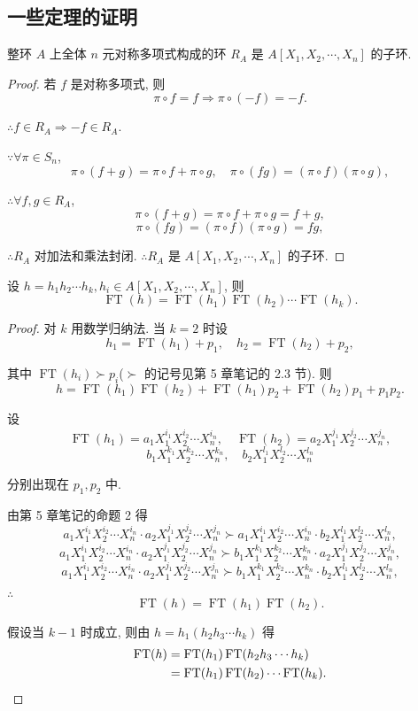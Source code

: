 \documentclass[UTF8]{ctexart}
\begin{document}
\subsection{一些定理的证明}
\begin{theorem}
    整环 $A$ 上全体 $n$ 元对称多项式构成的环 $R_A$ 是 $A[X_1,X_2,\cdots,X_n]$ 的子环.
\end{theorem}
\begin{proof}
    若 $f$ 是对称多项式, 则
    \[\pi\circ f=f\Rightarrow\pi\circ(-f)=-f.\]

    $\therefore f\in R_A\Rightarrow-f\in R_A$.

    $\because\forall\pi\in S_n$,
    \[\pi\circ(f+g)=\pi\circ f+\pi\circ g,\quad\pi\circ(fg)=(\pi\circ f)(\pi\circ g),\]

    $\therefore\forall f,g\in R_A$,
    \[\pi\circ(f+g)=\pi\circ f+\pi\circ g=f+g,\]
    \[\pi\circ(fg)=(\pi\circ f)(\pi\circ g)=fg,\]

    $\therefore R_A$ 对加法和乘法封闭. $\therefore R_A$ 是 $A[X_1,X_2,\cdots,X_n]$ 的子环.
\end{proof}
\begin{theorem}[书上的引理 1]
    设 $h=h_1h_2\cdots h_k,h_i\in A[X_1,X_2,\cdots,X_n]$, 则
    \[\operatorname{FT}(h)=\operatorname{FT}(h_1)\operatorname{FT}(h_2)\cdots\operatorname{FT}(h_k).\]
\end{theorem}
\begin{proof}
    对 $k$ 用数学归纳法. 当 $k=2$ 时设
    \[h_1=\operatorname{FT}(h_1)+p_1,\quad h_2=\operatorname{FT}(h_2)+p_2,\]

    其中 $\operatorname{FT}(h_i)\succ p_i$($\succ$ 的记号见第 5 章笔记的 2.3 节). 则
    \[h=\operatorname{FT}(h_1)\operatorname{FT}(h_2)+\operatorname{FT}(h_1)p_2+\operatorname{FT}(h_2)p_1+p_1p_2.\]

    设
    \[\operatorname{FT}(h_1)=a_1X_1^{i_1}X_2^{i_2}\cdots X_n^{i_n},\quad\operatorname{FT}(h_2)=a_2X_1^{j_1}X_2^{j_2}\cdots X_n^{j_n},\]
    \[b_1X_1^{k_1}X_2^{k_2}\cdots X_n^{k_n},\quad b_2X_1^{l_1}X_2^{l_2}\cdots X_n^{l_n}\]

    分别出现在 $p_1,p_2$ 中.

    由第 5 章笔记的命题 2 得
    \[a_1X_1^{i_1}X_2^{i_2}\cdots X_n^{i_n}\cdot a_2X_1^{j_1}X_2^{j_2}\cdots X_n^{j_n}\succ a_1X_1^{i_1}X_2^{i_2}\cdots X_n^{i_n}\cdot b_2X_1^{l_1}X_2^{l_2}\cdots X_n^{l_n},\]
    \[a_1X_1^{i_1}X_2^{i_2}\cdots X_n^{i_n}\cdot a_2X_1^{j_1}X_2^{j_2}\cdots X_n^{j_n}\succ b_1X_1^{k_1}X_2^{k_2}\cdots X_n^{k_n}\cdot a_2X_1^{j_1}X_2^{j_2}\cdots X_n^{j_n},\]
    \[a_1X_1^{i_1}X_2^{i_2}\cdots X_n^{i_n}\cdot a_2X_1^{j_1}X_2^{j_2}\cdots X_n^{j_n}\succ b_1X_1^{k_1}X_2^{k_2}\cdots X_n^{k_n}\cdot b_2X_1^{l_1}X_2^{l_2}\cdots X_n^{l_n},\]

    $\therefore$
    \[\operatorname{FT}(h)=\operatorname{FT}(h_1)\operatorname{FT}(h_2).\]

    假设当 $k-1$ 时成立, 则由 $h=h_1(h_2h_3\cdots h_k)$ 得
    \begin{align*}
        \operatorname{FT}(h) & =\operatorname{FT}(h_1)\operatorname{FT}(h_2h_3\cdots h_k) \\
        & =\operatorname{FT}(h_1)\operatorname{FT}(h_2)\cdots\operatorname{FT}(h_k).\qedhere
    \end{align*}
\end{proof}
\end{document}
